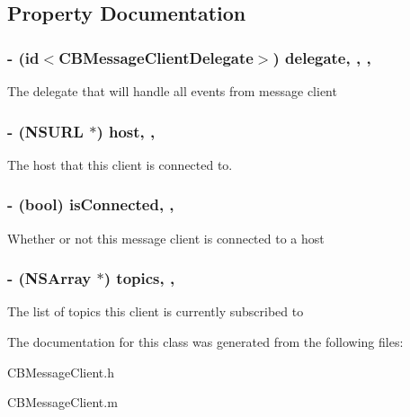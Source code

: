 \subsection{Property Documentation}
\hypertarget{interface_c_b_message_client_a6a94ee89f64cbc4bef855ecdda6fbf85}{
\subsubsection[{delegate}]{\setlength{\rightskip}{0pt plus 5cm}-\/ (id$<${\bf C\+B\+Message\+Client\+Delegate}$>$) delegate\hspace{0.3cm}{\ttfamily [read]}, {\ttfamily [write]}, {\ttfamily [atomic]}, {\ttfamily [weak]}}}\label{interface_c_b_message_client_a6a94ee89f64cbc4bef855ecdda6fbf85}
The delegate that will handle all events from message client \hypertarget{interface_c_b_message_client_a770ff8d5b798d220ecc7bc00804112d4}{
\subsubsection[{host}]{\setlength{\rightskip}{0pt plus 5cm}-\/ (N\+S\+U\+R\+L $\ast$) host\hspace{0.3cm}{\ttfamily [read]}, {\ttfamily [atomic]}, {\ttfamily [assign]}}}\label{interface_c_b_message_client_a770ff8d5b798d220ecc7bc00804112d4}
The host that this client is connected to. \hypertarget{interface_c_b_message_client_a6a385330b831471122ffb52b101422fb}{
\subsubsection[{is\+Connected}]{\setlength{\rightskip}{0pt plus 5cm}-\/ (bool) is\+Connected\hspace{0.3cm}{\ttfamily [read]}, {\ttfamily [atomic]}, {\ttfamily [assign]}}}\label{interface_c_b_message_client_a6a385330b831471122ffb52b101422fb}
Whether or not this message client is connected to a host \hypertarget{interface_c_b_message_client_a41081dc92c32ef8aa7ab364463825398}{
\subsubsection[{topics}]{\setlength{\rightskip}{0pt plus 5cm}-\/ (N\+S\+Array $\ast$) topics\hspace{0.3cm}{\ttfamily [read]}, {\ttfamily [atomic]}, {\ttfamily [assign]}}}\label{interface_c_b_message_client_a41081dc92c32ef8aa7ab364463825398}
The list of topics this client is currently subscribed to 

The documentation for this class was generated from the following files\+:\begin{DoxyCompactItemize}
\item 
C\+B\+Message\+Client.\+h\item 
C\+B\+Message\+Client.\+m\end{DoxyCompactItemize}
